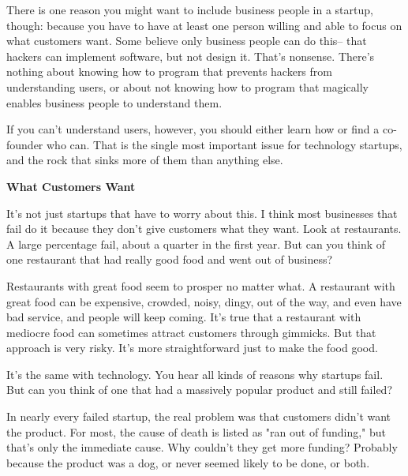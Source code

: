 There
                    is one reason you might want to include business people in a
                    startup, though: because you have to have at least one
                    person willing and able to focus on what customers want.
                    Some believe only business people can do this-- that hackers
                    can implement software, but not design it. That's nonsense.
                    There's nothing about knowing how to program that prevents
                    hackers from understanding users, or about not knowing how
                    to program that magically enables business people to
                    understand them.

If you can't understand users,
                    however, you should either learn how or find a co-founder
                    who can. That is the single most important issue for
                    technology startups, and the rock that sinks more of them
                    than anything else.

\textbf{What Customers Want}

It's not just startups that have to worry about
                    this. I think most businesses that fail do it because they
                    don't give customers what they want. Look at restaurants. A
                    large percentage fail, about a quarter in the first year.
                    But can you think of one restaurant that had really good
                    food and went out of business?

Restaurants with
                    great food seem to prosper no matter what. A restaurant with
                    great food can be expensive, crowded, noisy, dingy, out of
                    the way, and even have bad service, and people will keep
                    coming. It's true that a restaurant with mediocre food can
                    sometimes attract customers through gimmicks. But that
                    approach is very risky. It's more straightforward just to
                    make the food good.

It's the same with
                    technology. You hear all kinds of reasons why startups fail.
                    But can you think of one that had a massively popular
                    product and still failed?

In nearly every failed
                    startup, the real problem was that customers didn't want the
                    product. For most, the cause of death is listed as "ran out
                    of funding," but that's only the immediate cause. Why
                    couldn't they get more funding? Probably because the product
                    was a dog, or never seemed likely to be done, or both.


